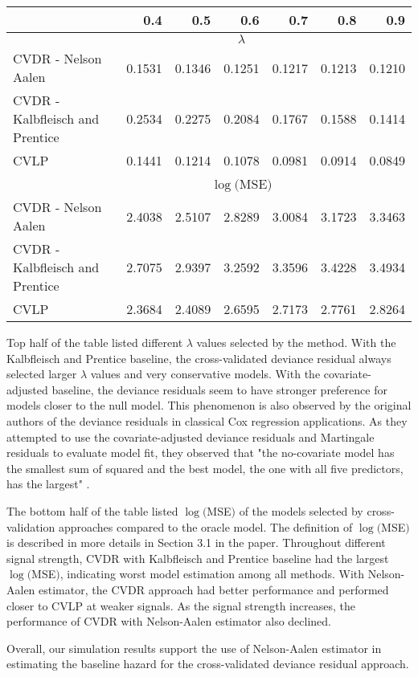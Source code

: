 \documentclass{article}
\begin{document}
\begin{table}[h]
\centering
\begin{tabular}{lrrrrrr}
\toprule
  & 0.4 & 0.5 & 0.6 & 0.7 & 0.8 & 0.9\\
\midrule
\vspace{1mm}
 & \multicolumn{5}{c}{$\lambda$} & \\ 
\vspace{1mm}
CVDR - Nelson Aalen & 0.1531 & 0.1346 & 0.1251 & 0.1217 & 0.1213 & 0.1210\\
CVDR - Kalbfleisch and Prentice& 0.2534 & 0.2275 & 0.2084 & 0.1767 & 0.1588 & 0.1414\\
CVLP & 0.1441 & 0.1214 & 0.1078 & 0.0981 & 0.0914 & 0.0849\\
\vspace{1mm}
 & \multicolumn{5}{c}{$\log($MSE$)$} & \\ 
\vspace{1mm}

CVDR - Nelson Aalen & 2.4038 & 2.5107 & 2.8289 & 3.0084 & 3.1723 & 3.3463\\
CVDR - Kalbfleisch and Prentice& 2.7075 & 2.9397 & 3.2592 & 3.3596 & 3.4228 & 3.4934\\
CVLP &2.3684 & 2.4089 & 2.6595 & 2.7173 & 2.7761 & 2.8264\\
\bottomrule
\end{tabular}
\end{table}

Top half of the table listed different $\lambda$ values selected by the method. With the Kalbfleisch and Prentice baseline, the cross-validated deviance residual always selected larger $\lambda$ values and very conservative models. With the covariate-adjusted baseline, the deviance residuals seem to have stronger preference for models closer to the null model. This phenomenon is also observed by the original authors of the deviance residuals in classical Cox regression applications. As they attempted to use the covariate-adjusted deviance residuals and Martingale residuals to evaluate model fit, they observed that "the no-covariate model has the smallest sum of squared and the best model, the one with all five predictors, has the largest" \citep{Therneau2000modeling}.

The bottom half of the table listed $\log($MSE$)$ of the models selected by cross-validation approaches compared to the oracle model. The definition of $\log($MSE$)$ is described in more details in Section 3.1 in the paper. Throughout different signal strength, CVDR with Kalbfleisch and Prentice baseline had the largest $\log($MSE$)$, indicating worst model estimation among all methods. With Nelson-Aalen estimator, the CVDR approach had better performance and performed closer to CVLP at weaker signals. As the signal strength increases, the performance of CVDR with Nelson-Aalen estimator also declined.

Overall, our simulation results support the use of Nelson-Aalen estimator in estimating the baseline hazard for the cross-validated deviance residual approach.




\end{document}
